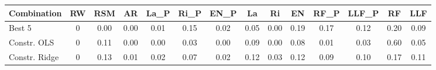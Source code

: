 \begin{tabular}{lccccccccccccc}
\toprule
Combination & RW & RSM & AR & La\_P & Ri\_P & EN\_P & La & Ri & EN & RF\_P & LLF\_P & RF & LLF
\\
\midrule
Best 5 & 0 & 0.00 & 0.00 & 0.01 & 0.15 & 0.02 & 0.05 & 0.00 & 0.19 & 0.17 & 0.12 & 0.20 & 0.09 \\
Constr. OLS & 0 & 0.11 & 0.00 & 0.00 & 0.03 & 0.00 & 0.09 & 0.00 & 0.08 & 0.01 & 0.03 & 0.60 & 0.05 \\
Constr. Ridge & 0 & 0.13 & 0.01 & 0.02 & 0.07 & 0.02 & 0.12 & 0.03 & 0.12 & 0.09 & 0.10 & 0.17 & 0.11 \\
\bottomrule
\end{tabular}
